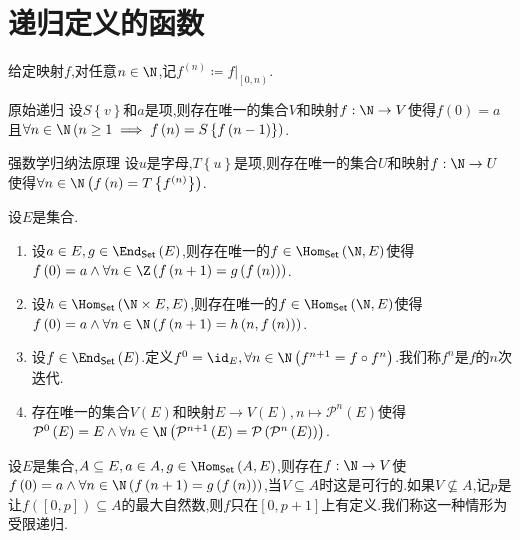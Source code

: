 \section{递归定义的函数}

\begin{definition}{}{}
	给定映射$f$,对任意$n\in\N$,记$f^{\left(n\right)}\coloneq f|_{\left[0,n\right)}$.
\end{definition}

\begin{metatheorem}{原始递归}{}
	设$S\left\{v\right\}$和$a$是项,则存在唯一的集合$V$和映射$f:\N\to V$使得$f\left(0\right)=a$且$\forall n\in\N\left(n\geq 1\implies f\left(n\right)=S\left\{f\left(n-1\right)\right\}\right)$.
\end{metatheorem}

\begin{metatheorem}{强数学归纳法原理}{}
	设$u$是字母,$T\left\{u\right\}$是项,则存在唯一的集合$U$和映射$f:\N\to U$使得$\forall n\in\N\left(f\left(n\right)=T\left\{f^{\left(n\right)}\right\}\right)$.
\end{metatheorem}

\begin{example}{}{}
	设$E$是集合.
	\begin{enumerate}
		\item 设$a\in E,g\in\End_{\mathsf{Set}}\left(E\right)$,则存在唯一的$f\in\Hom_{\mathsf{Set}}\left(\N,E\right)$使得$f\left(0\right)=a\wedge\forall n\in\Z\left(f\left(n+1\right)=g\left(f\left(n\right)\right)\right)$.
		\item 设$h\in\Hom_{\mathsf{Set}}\left(\N\times E,E\right)$,则存在唯一的$f\in\Hom_{\mathsf{Set}}\left(\N,E\right)$使得$f\left(0\right)=a\wedge\forall n\in\N\left(f\left(n+1\right)=h\left(n,f\left(n\right)\right)\right)$.
		\item 设$f\in\End_{\mathsf{Set}}\left(E\right)$.定义$f^{0}=\id_{E},\forall n\in\N\left(f^{n+1}=f\circ f^{n}\right)$.我们称$f^{n}$是$f$的$n$次迭代.
		\item 存在唯一的集合$V\left(E\right)$和映射$E\to V\left(E\right),n\mapsto\mathcal{P}^{n}\left(E\right)$使得$\mathcal{P}^{0}\left(E\right)=E\wedge\forall n\in\N\left(\mathcal{P}^{n+1}\left(E\right)=\mathcal{P}\left(\mathcal{P}^{n}\left(E\right)\right)\right)$.
	\end{enumerate}
\end{example}

\begin{remark}{}{}
	设$E$是集合,$A\subseteq E,a\in A,g\in\Hom_{\mathsf{Set}}\left(A,E\right)$,则存在$f:\N\to V$使$f\left(0\right)=a\wedge\forall n\in\N\left(f\left(n+1\right)=g\left(f\left(n\right)\right)\right)$,当$V\subseteq A$时这是可行的.如果$V\nsubseteq A$,记$p$是让$f\left(\left[0,p\right]\right)\subseteq A$的最大自然数,则$f$只在$\left[0,p+1\right]$上有定义.我们称这一种情形为受限递归.
\end{remark}




